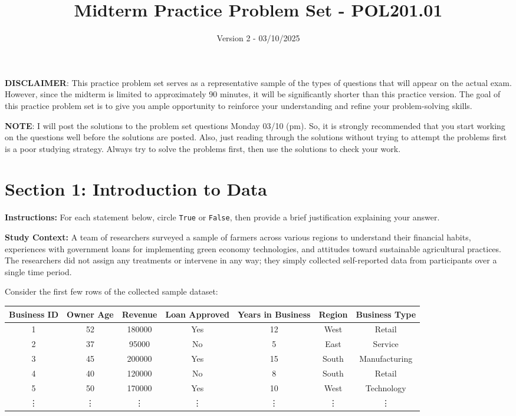 \documentclass{article}
\title{Midterm Practice Problem Set - POL201.01}
\author{Version 2 - 03/10/2025}
\date{}
\begin{document}
\maketitle

\textbf{DISCLAIMER}: This practice problem set serves as a representative sample of the types of questions that will appear on the actual exam. However, since the midterm is limited to approximately 90 minutes, it will be significantly shorter than this practice version. The goal of this practice problem set is to give you ample opportunity to reinforce your understanding and refine your problem-solving skills.

\textbf{NOTE}: I will post the solutions to the problem set questions Monday 03/10 (pm). So, it is strongly recommended that you start working on the questions well before the solutions are posted. Also, just reading through the solutions without trying to attempt the problems first is a poor studying strategy. Always try to solve the problems first, then use the solutions to check your work.

\section*{Section 1: Introduction to Data}

\noindent\textbf{Instructions:}  
For each statement below, circle \texttt{True} or \texttt{False}, then provide a brief justification explaining your answer.

\vspace{0.5cm}

\noindent \textbf{Study Context:}  
A team of researchers surveyed a sample of farmers across various regions to understand their financial habits, experiences with government loans for implementing green economy technologies, and attitudes toward sustainable agricultural practices. The researchers did not assign any treatments or intervene in any way; they simply collected self-reported data from participants over a single time period.

\vspace{0.5cm}
\noindent Consider the first few rows of the collected sample dataset:

\begin{center}
\small
\begin{tabular}{c|c|c|c|c|c|c}
\textbf{Business ID} & \textbf{Owner Age} & \textbf{Revenue} & \textbf{Loan Approved} & \textbf{Years in Business} & \textbf{Region} & \textbf{Business Type}\\
\hline
1 & 52 & 180000 & Yes & 12 & West & Retail\\
2 & 37 & 95000 & No & 5 & East & Service\\
3 & 45 & 200000 & Yes & 15 & South & Manufacturing\\
4 & 40 & 120000 & No & 8 & South & Retail\\
5 & 50 & 170000 & Yes & 10 & West & Technology\\
\vdots & \vdots & \vdots & \vdots & \vdots & \vdots & \vdots
\end{tabular}
\normalsize
\end{center}
\end{document}
